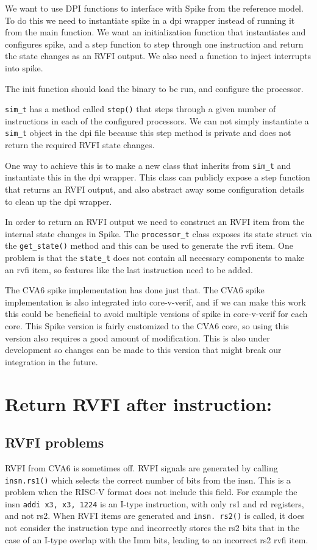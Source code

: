 We want to use DPI functions to interface with Spike from the reference model. To do this we need to instantiate spike in a dpi wrapper instead of running it from the main function. We want an initialization function that instantiates and configures spike, and a step function to step through one instruction and return the state changes as an RVFI output. We also need a function to inject interrupts into spike.

The init function should load the binary to be run, and configure the processor.

\lstinline{sim_t} has a method called \lstinline{step()} that steps through a given number of instructions in each of the configured processors. 
We can not simply instantiate a \lstinline{sim_t} object in the dpi file because this step method is private and does not return the required RVFI state changes.

One way to achieve this is to make a new class that inherits from \lstinline{sim_t} and instantiate this in the dpi wrapper. This class can publicly expose a step function that returns an RVFI output, and also abstract away some configuration details to clean up the dpi wrapper. 

In order to return an RVFI output we need to construct an RVFI item from the internal state changes in Spike. The \lstinline{processor_t} class exposes its state struct via the \lstinline{get_state()} method and this can be used to generate the rvfi item.
One problem is that the \lstinline{state_t} does not contain all necessary components to make an rvfi item, so features like the last instruction need to be added.


The CVA6 spike implementation has done just that. The CVA6 spike implementation is also integrated into core-v-verif, and if we can make this work this could be beneficial to avoid multiple versions of spike in core-v-verif for each core. This Spike version is fairly customized to the CVA6 core, so using this version also requires a good amount of modification.
This is also under development so changes can be made to this version that might break our integration in the future.



\section{Return RVFI after instruction: }

\subsection{RVFI problems}
RVFI from CVA6 is sometimes off. RVFI signals are generated by calling \lstinline{insn.rs1()} which selects the correct number of bits from the insn. This is a problem when the RISC-V format does not include this field. For example the insn \lstinline{addi x3, x3, 1224} is an I-type instruction, with only rs1 and rd registers, and not rs2. When RVFI items are generated and \lstinline{insn. rs2()} is called, it does not consider the instruction type and incorrectly stores the rs2 bits that in the case of an I-type overlap with the Imm bits, leading to an incorrect rs2 rvfi item.


